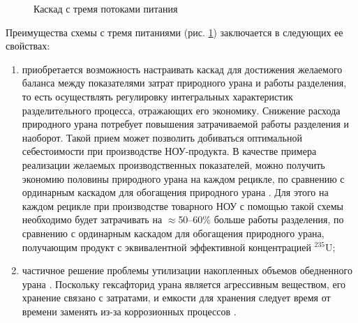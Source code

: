 \begin{figure}[ht]
  \caption{Каскад с тремя потоками питания}\label{fig:3_inputs}
\end{figure}

Преимущества схемы с тремя питаниями (рис. \ref{fig:3_inputs}) заключается в следующих ее свойствах:

\begin{enumerate}
  \item приобретается возможность настраивать каскад для достижения желаемого баланса между показателями затрат природного урана и работы разделения, то есть осуществлять регулировку интегральных характеристик разделительного процесса, отражающих его экономику. Снижение расхода природного урана потребует повышения затрачиваемой работы разделения и наоборот. Такой прием может позволить добиваться оптимальной себестоимости при производстве НОУ-продукта. В качестве примера реализации желаемых производственных показателей, можно получить экономию половины природного урана на каждом рецикле, по сравнению с ординарным каскадом для обогащения природного урана   \cite{smirnovApplyingEnrichmentCapacities2018}. Для этого на каждом рецикле при производстве товарного НОУ с помощью такой схемы необходимо будет затрачивать на $\approx$50--60\% больше работы разделения, по сравнению с ординарным каскадом для обогащения природного урана, получающим продукт с эквивалентной эффективной концентрацией $^{235}$U;
  \item частичное решение проблемы утилизации накопленных объемов обедненного урана \cite{smirnovEnrichmentRegeneratedUranium2014}. Поскольку гексафторид урана является агрессивным веществом, его хранение связано с затратами, и емкости для хранения следует время от времени заменять из-за коррозионных процессов \cite{fitchOPTIONSDISPOSALREAPPLICATION2009, oecdManagementDepletedUranium2001}.
\end{enumerate}

